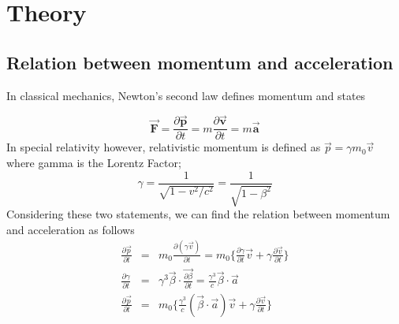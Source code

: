\documentclass{article}
\begin{document}
\newcommand{\vecthreeBF}[1]{\vec{\textbf{#1}}}
\newcommand{\vecthree}[1]{\vec{#1}}

\newcommand{\parDeriv}[2]{\frac{\partial #1}{\partial #2}}
\newcommand{\parDerivS}[2]{\frac{\partial^2 #1}{\partial #2^2}}

\newcommand{\dotProdBF}[2]{\vecthreeBF{#1} \cdot \vecthreeBF{#2}}
\newcommand{\dotProd}[2]{\vecthree{#1} \cdot \vecthree{#2}}

\newcommand{\crossProdBF}[2]{\vecthreeBF{#1} \times \vecthreeBF{#2}}
\newcommand{\crossProd}[2]{\vecthree{#1} \times \vecthree{#2}}


\newcommand{\fromeq}[1]{\textit{equation \ref{eq:#1}}}
\newcommand{\fromeqs}[2]{\textit{equations \ref{eq:#1} and \ref{eq:#2}}}

\section{Theory}


\subsection{Relation between momentum and acceleration}
In classical mechanics, Newton's second law defines momentum and states 

\begin{equation}
    \vecthreeBF{F} = \frac{\partial \vecthreeBF{p}}{\partial t} = m \frac{\partial \vecthreeBF{v}}{\partial t} = m \vecthreeBF{a}
\end{equation}
\newline
In special relativity however, relativistic momentum is defined as $\vecthree{p} = \gamma m_0 \vecthree{v} $ where gamma is the Lorentz Factor;
\begin{equation*}
    \gamma = \frac{1}{\sqrt{1-v^2 / c^2}} = \frac{1}{\sqrt{1-\beta^2}}
\end{equation*}
\newline
Considering these two statements, we can find the relation between momentum and acceleration as follows
\begin{eqnarray*}
    \parDeriv{\vecthree{p}}{t} &=& m_0 \parDeriv{(\gamma \vecthree{v})}{t} = m_0 \{  \parDeriv{\gamma}{t}\vecthree{v} + \gamma \parDeriv{\vecthree{v}}{t}  \} \\
    \parDeriv{\gamma}{t} &=& \gamma^3 \dotProd{\beta}{\parDeriv{\beta}{t}} = \frac{\gamma^3}{c} \dotProd{\beta}{a} \\
    \parDeriv{\vecthree{p}}{t}  &=& m_0 \{   \frac{\gamma^3}{c} (\dotProd{\beta}{a} )\vecthree{v} + \gamma \parDeriv{\vecthree{v}}{t}  \} 
\end{eqnarray*}
\end{document}
